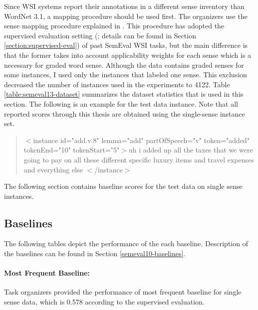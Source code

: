 Since WSI systems report their annotations in a different sense inventory than WordNet 3.1, a mapping procedure should be used first. The organizers use the sense mapping procedure explained in \cite{jurgens12evaluation}. This procedure has adopted the supervised evaluation setting  (\cite{agirre06evaluating}; details can be found in Section \ref{section:supervised-eval}) of past SemEval WSI tasks, but the main difference is that the former takes into account applicability weights for each sense which is a necessary for graded word sense. Although the data contains graded senses for some instances, I used only the instances that labeled one sense. This exclusion decreased the number of instances used in the experiments to 4122. Table \ref{table:semeval13-dataset} summarizes the dataset statistics that is used in this section. The following is an example for the test data instance. Note that all reported scores through this thesis are obtained using the single-sense instance set.

\begin{quote}
 $<$instance id="add.v.8" 
 lemma="add" partOfSpeech="v" token="added" tokenEnd="10" tokenStart="5"$>$uh i added up all the taxes that we were going to pay on all these different specific luxury items and travel expenses and everything else
 $<$/instance$>$
\end{quote}

The following section contains baseline scores for the test data on single sense instances.




\subsection{Baselines}

The following tables depict the performance of the each baseline. Description of the baselines can be found in Section \ref{semeval10-baselines}.


\paragraph{Most Frequent Baseline:} Task organizers provided the performance of most frequent baseline for single sense data, which is 0.578 according to the supervised evaluation.

